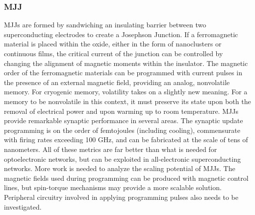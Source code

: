 \documentclass{article}
\begin{document}
\subsubsection{MJJ}

MJJs are formed by sandwiching an insulating barrier between two superconducting electrodes to create a Josephson Junction. If a ferromagnetic material is placed within the oxide, either in the form of nanoclusters or continuous films, the critical current of the junction can be controlled by changing the alignment of magnetic moments within the insulator. The magnetic order of the ferromagnetic materials can be programmed with current pulses in the presence of an external magnetic field, providing an analog, nonvolatile memory. For cryogenic memory, volatility takes on a slightly new meaning. For a memory to be nonvolatile in this context, it must preserve its state upon both the removal of electrical power and upon warming up to room temperature. MJJs provide remarkable synaptic performance in several areas. The synaptic update programming is on the order of femtojoules (including cooling), commensurate with firing rates exceeding 100 GHz, and can be fabricated at the scale of tens of nanometers. All of these metrics are far better than what is needed for optoelectronic networks, but can be exploited in all-electronic superconducting networks. More work is needed to analyze the scaling potential of MJJs. The magnetic fields used during programming can be produced with magnetic control lines, but spin-torque mechanisms may provide a more scalable solution. Peripheral circuitry involved in applying programming pulses also needs to be investigated. \cite{schneider2018ultralow}
\end{document}
